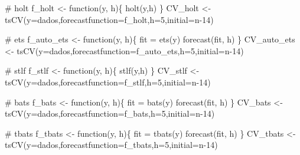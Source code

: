 \documentclass[
  letterpaper,
  DIV=11,
  numbers=noendperiod]{scrartcl}
\newenvironment{Shaded}{\begin{snugshade}}{\end{snugshade}}
\newcommand{\AttributeTok}[1]{\textcolor[rgb]{0.40,0.45,0.13}{#1}}
\newcommand{\CommentTok}[1]{\textcolor[rgb]{0.37,0.37,0.37}{#1}}
\newcommand{\ControlFlowTok}[1]{\textcolor[rgb]{0.00,0.23,0.31}{#1}}
\newcommand{\DecValTok}[1]{\textcolor[rgb]{0.68,0.00,0.00}{#1}}
\newcommand{\FunctionTok}[1]{\textcolor[rgb]{0.28,0.35,0.67}{#1}}
\newcommand{\NormalTok}[1]{\textcolor[rgb]{0.00,0.23,0.31}{#1}}
\newcommand{\OtherTok}[1]{\textcolor[rgb]{0.00,0.23,0.31}{#1}}
\begin{document}
\begin{Shaded}
\begin{Highlighting}[]
\CommentTok{\# holt}
\NormalTok{f\_holt }\OtherTok{\textless{}{-}} \ControlFlowTok{function}\NormalTok{(y, h)\{}
  \FunctionTok{holt}\NormalTok{(y,h)}
\NormalTok{\}}
\NormalTok{CV\_holt }\OtherTok{\textless{}{-}} \FunctionTok{tsCV}\NormalTok{(}\AttributeTok{y=}\NormalTok{dados,}\AttributeTok{forecastfunction=}\NormalTok{f\_holt,}\AttributeTok{h=}\DecValTok{5}\NormalTok{,}\AttributeTok{initial=}\NormalTok{n}\DecValTok{{-}14}\NormalTok{)}

\CommentTok{\# ets}
\NormalTok{f\_auto\_ets }\OtherTok{\textless{}{-}} \ControlFlowTok{function}\NormalTok{(y, h)\{}
\NormalTok{  fit }\OtherTok{=} \FunctionTok{ets}\NormalTok{(y)}
  \FunctionTok{forecast}\NormalTok{(fit, h)}
\NormalTok{\}}
\NormalTok{CV\_auto\_ets }\OtherTok{\textless{}{-}} \FunctionTok{tsCV}\NormalTok{(}\AttributeTok{y=}\NormalTok{dados,}\AttributeTok{forecastfunction=}\NormalTok{f\_auto\_ets,}\AttributeTok{h=}\DecValTok{5}\NormalTok{,}\AttributeTok{initial=}\NormalTok{n}\DecValTok{{-}14}\NormalTok{)}

\CommentTok{\# stlf}
\NormalTok{f\_stlf }\OtherTok{\textless{}{-}} \ControlFlowTok{function}\NormalTok{(y, h)\{}
  \FunctionTok{stlf}\NormalTok{(y,h)}
\NormalTok{\}}
\NormalTok{CV\_stlf }\OtherTok{\textless{}{-}} \FunctionTok{tsCV}\NormalTok{(}\AttributeTok{y=}\NormalTok{dados,}\AttributeTok{forecastfunction=}\NormalTok{f\_stlf,}\AttributeTok{h=}\DecValTok{5}\NormalTok{,}\AttributeTok{initial=}\NormalTok{n}\DecValTok{{-}14}\NormalTok{)}

\CommentTok{\# bats}
\NormalTok{f\_bats }\OtherTok{\textless{}{-}} \ControlFlowTok{function}\NormalTok{(y, h)\{}
\NormalTok{  fit }\OtherTok{=} \FunctionTok{bats}\NormalTok{(y)}
  \FunctionTok{forecast}\NormalTok{(fit, h)}
\NormalTok{\}}
\NormalTok{CV\_bats }\OtherTok{\textless{}{-}} \FunctionTok{tsCV}\NormalTok{(}\AttributeTok{y=}\NormalTok{dados,}\AttributeTok{forecastfunction=}\NormalTok{f\_bats,}\AttributeTok{h=}\DecValTok{5}\NormalTok{,}\AttributeTok{initial=}\NormalTok{n}\DecValTok{{-}14}\NormalTok{)}

\CommentTok{\# tbats}
\NormalTok{f\_tbats }\OtherTok{\textless{}{-}} \ControlFlowTok{function}\NormalTok{(y, h)\{}
\NormalTok{  fit }\OtherTok{=} \FunctionTok{tbats}\NormalTok{(y)}
  \FunctionTok{forecast}\NormalTok{(fit, h)}
\NormalTok{\}}
\NormalTok{CV\_tbats }\OtherTok{\textless{}{-}} \FunctionTok{tsCV}\NormalTok{(}\AttributeTok{y=}\NormalTok{dados,}\AttributeTok{forecastfunction=}\NormalTok{f\_tbats,}\AttributeTok{h=}\DecValTok{5}\NormalTok{,}\AttributeTok{initial=}\NormalTok{n}\DecValTok{{-}14}\NormalTok{)}


\end{Highlighting}
\end{Shaded}
\end{document}
